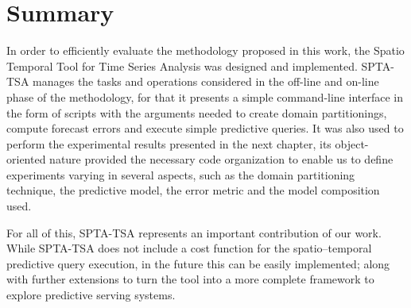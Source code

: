 \section{Summary}
\label{Sec:implementation_summary}

In order to efficiently evaluate the methodology proposed in this work, the Spatio Temporal Tool for Time Series Analysis was designed and implemented. SPTA-TSA manages the tasks and operations considered in the off-line and on-line phase of the methodology, for that it presents a simple command-line interface in the form of scripts with the arguments needed to create domain partitionings, compute forecast errors and execute simple predictive queries. It was also used to perform the experimental results presented in the next chapter, its object-oriented nature provided the necessary code organization to enable us to define experiments varying in several aspects, such as the domain partitioning technique, the predictive model, the error metric and the model composition used.

For all of this, SPTA-TSA represents an important contribution of our work. While SPTA-TSA does not include a cost function for the spatio--temporal predictive query execution, in the future this can be easily implemented; along with further extensions to turn the tool into a more complete framework to explore predictive serving systems.